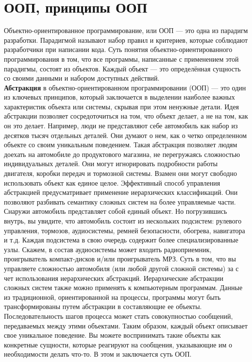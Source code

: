 


\section{ООП, принципы ООП}
\noindent Объектно-ориентированное программирование, или ООП — это одна из парадигм разработки. Парадигмой называют набор правил и критериев, которые соблюдают разработчики при написании кода. Суть понятия объектно-ориентированного программирования в том, что все программы, написанные с применением этой парадигмы, состоят из объектов. Каждый объект — это определённая сущность со своими данными и набором доступных действий.  \\
\textbf{Абстракция} в объектно-ориентированном программировании (ООП) — это один из ключевых принципов, который заключается в выделении наиболее важных характеристик объекта или системы, скрывая при этом ненужные детали. Идея абстракции позволяет сосредоточиться на том, что объект делает, а не на том, как он это делает. Например, люди не представляют себе автомобиль как набор из десятков тысяч отдельных деталей. Они думают о нем, как о четко определенном объекте со своим уникальным поведением. Такая абстракция позволяет людям доехать на автомобиле до продуктового магазина, не перегружаясь сложностью индивидуальных деталей. Они могут игнорировать подробности работы двигателя, коробки передач и тормозной системы. Взамен они могут свободно использовать объект как единое целое. Эффективный способ управления абстракцией предусматривает применение иерархических классификаций. Они позволяют разбивать семантику сложных систем на более управляемые части. Снаружи автомобиль представляет собой единый объект. Но погрузившись внутрь, вы увидите, что автомобиль состоит из нескольких подсистем: рулевого управления, тормозов, аудиосистемы, ремней безопасности, обогрева, навигатора и т.д. Каждая подсистема в свою очередь содержит более специализированные узлы. Скажем, в состав аудиосистемы может входить радиоприемник, проигрыватель компакт-дисков и/или проигрыватель МРЗ. Суть в том, что вы управляете сложностью автомобиля (или любой другой сложной системы) за с чет использования иерархических абстракций. Иерархические абстракции сложных систем также можно применять к компьютерным программам. Данные из традиционной, ориентированной на процессы, программы могут быть трансформированы путем абстракции в составляющие ее объекты. Последовательность шагов процесса может стать совокупностью сообщений, передаваемых между этими объектами. Таким образом, каждый объект описывает свое уникальное поведение. Вы можете воспринимать такие объекты как конкретные сущности, которые реагируют на сообщения, указывающие им о необходимости делать что-то. В этом и заключается суть ООП. \\
